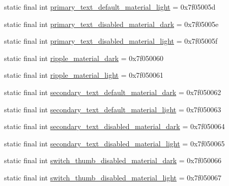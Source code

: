 \begin{DoxyCompactItemize}
\item 
static final int \mbox{\hyperlink{classandroid_1_1support_1_1v7_1_1appcompat_1_1_r_1_1color_ab36d1e90360d5a93724ea06e0fb4eaea}{primary\+\_\+text\+\_\+default\+\_\+material\+\_\+light}} = 0x7f05005d
\item 
static final int \mbox{\hyperlink{classandroid_1_1support_1_1v7_1_1appcompat_1_1_r_1_1color_a71e048d87b5feafa695cf01a565a4e3e}{primary\+\_\+text\+\_\+disabled\+\_\+material\+\_\+dark}} = 0x7f05005e
\item 
static final int \mbox{\hyperlink{classandroid_1_1support_1_1v7_1_1appcompat_1_1_r_1_1color_acbf6e5e5cb1d31d8e8532e7b1402ca96}{primary\+\_\+text\+\_\+disabled\+\_\+material\+\_\+light}} = 0x7f05005f
\item 
static final int \mbox{\hyperlink{classandroid_1_1support_1_1v7_1_1appcompat_1_1_r_1_1color_a8a6b3082ea6856989bc2959dfe9276c5}{ripple\+\_\+material\+\_\+dark}} = 0x7f050060
\item 
static final int \mbox{\hyperlink{classandroid_1_1support_1_1v7_1_1appcompat_1_1_r_1_1color_a15949cbaffddc41a139e2075c8bb3f14}{ripple\+\_\+material\+\_\+light}} = 0x7f050061
\item 
static final int \mbox{\hyperlink{classandroid_1_1support_1_1v7_1_1appcompat_1_1_r_1_1color_a37d7fa18b0ff48fbaf8ee035afc43a2c}{secondary\+\_\+text\+\_\+default\+\_\+material\+\_\+dark}} = 0x7f050062
\item 
static final int \mbox{\hyperlink{classandroid_1_1support_1_1v7_1_1appcompat_1_1_r_1_1color_a2f57c3847bf68150f0fd7f8c93799ad6}{secondary\+\_\+text\+\_\+default\+\_\+material\+\_\+light}} = 0x7f050063
\item 
static final int \mbox{\hyperlink{classandroid_1_1support_1_1v7_1_1appcompat_1_1_r_1_1color_a23fe3e162981d29924942c7b1bf05882}{secondary\+\_\+text\+\_\+disabled\+\_\+material\+\_\+dark}} = 0x7f050064
\item 
static final int \mbox{\hyperlink{classandroid_1_1support_1_1v7_1_1appcompat_1_1_r_1_1color_a8724fc74358a7718ea386065610dbc0c}{secondary\+\_\+text\+\_\+disabled\+\_\+material\+\_\+light}} = 0x7f050065
\item 
static final int \mbox{\hyperlink{classandroid_1_1support_1_1v7_1_1appcompat_1_1_r_1_1color_abcca137fe8d9969eee2d1398c08de973}{switch\+\_\+thumb\+\_\+disabled\+\_\+material\+\_\+dark}} = 0x7f050066
\item 
static final int \mbox{\hyperlink{classandroid_1_1support_1_1v7_1_1appcompat_1_1_r_1_1color_a489562997ece3fe0de5f8ab8e70813f2}{switch\+\_\+thumb\+\_\+disabled\+\_\+material\+\_\+light}} = 0x7f050067

\end{DoxyCompactItemize}
